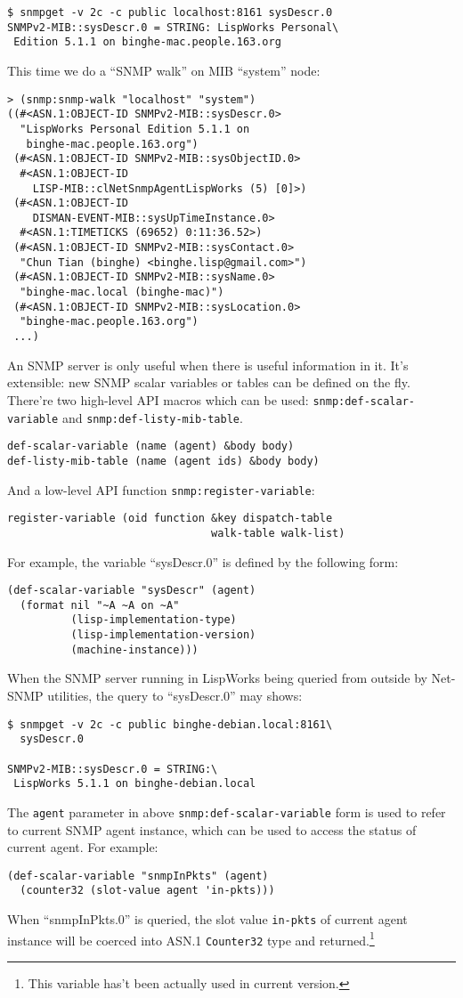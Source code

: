 \documentclass[reprint,9pt]{sigplanconf}
\begin{document}
\begin{verbatim}
$ snmpget -v 2c -c public localhost:8161 sysDescr.0
SNMPv2-MIB::sysDescr.0 = STRING: LispWorks Personal\
 Edition 5.1.1 on binghe-mac.people.163.org
\end{verbatim}

This time we do a ``SNMP walk'' on MIB ``system'' node:
\begin{verbatim}
> (snmp:snmp-walk "localhost" "system")
((#<ASN.1:OBJECT-ID SNMPv2-MIB::sysDescr.0>
  "LispWorks Personal Edition 5.1.1 on
   binghe-mac.people.163.org")
 (#<ASN.1:OBJECT-ID SNMPv2-MIB::sysObjectID.0>
  #<ASN.1:OBJECT-ID
    LISP-MIB::clNetSnmpAgentLispWorks (5) [0]>)
 (#<ASN.1:OBJECT-ID
    DISMAN-EVENT-MIB::sysUpTimeInstance.0>
  #<ASN.1:TIMETICKS (69652) 0:11:36.52>)
 (#<ASN.1:OBJECT-ID SNMPv2-MIB::sysContact.0>
  "Chun Tian (binghe) <binghe.lisp@gmail.com>")
 (#<ASN.1:OBJECT-ID SNMPv2-MIB::sysName.0>
  "binghe-mac.local (binghe-mac)")
 (#<ASN.1:OBJECT-ID SNMPv2-MIB::sysLocation.0>
  "binghe-mac.people.163.org")
 ...)
\end{verbatim}

An SNMP server is only useful when there is useful information in it.
It's extensible: new SNMP scalar variables or tables can be defined on the
fly. There're two high-level API macros which can be used:
\texttt{snmp:def-scalar-variable} and \texttt{snmp:def-listy-mib-table}.
\begin{verbatim}
def-scalar-variable (name (agent) &body body)
def-listy-mib-table (name (agent ids) &body body)
\end{verbatim}
And a low-level API function \texttt{snmp:register-variable}:
\begin{verbatim}
register-variable (oid function &key dispatch-table
                                walk-table walk-list)
\end{verbatim}
For example, the variable ``sysDescr.0'' is defined by the following
form:
\begin{verbatim}
(def-scalar-variable "sysDescr" (agent)
  (format nil "~A ~A on ~A"
          (lisp-implementation-type)
          (lisp-implementation-version)
          (machine-instance)))
\end{verbatim}
When the SNMP server running in LispWorks being queried from outside
by Net-SNMP utilities, the query to ``sysDescr.0'' may shows:
\begin{verbatim}
$ snmpget -v 2c -c public binghe-debian.local:8161\
  sysDescr.0

SNMPv2-MIB::sysDescr.0 = STRING:\
 LispWorks 5.1.1 on binghe-debian.local
\end{verbatim}
The \texttt{agent} parameter in above
\texttt{snmp:def-scalar-variable} form is used to refer to current
SNMP agent instance, which can be used to access the status of current
agent. For example:
\begin{verbatim}
(def-scalar-variable "snmpInPkts" (agent)
  (counter32 (slot-value agent 'in-pkts)))
\end{verbatim}
When ``snmpInPkts.0'' is queried, the slot value \texttt{in-pkts} of current
agent instance will be coerced into ASN.1 \texttt{Counter32} type and
returned.\footnote{This variable has't been actually used in current version.}
\end{document}
